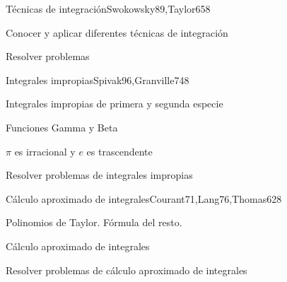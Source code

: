\begin{syllabus}
\begin{unit}{Técnicas de integración}{Swokowsky89,Taylor65}{8}
\begin{unitgoals}
	\item Conocer y aplicar diferentes técnicas de integración
	\item Resolver problemas
\end{unitgoals}
\end{unit}

\begin{unit}{Integrales impropias}{Spivak96,Granville74}{8}
\begin{topics}
	\item Integrales impropias de primera y segunda especie
	\item Funciones Gamma y Beta
	\item $\pi$ es irracional y $e$ es trascendente
\end{topics}

\begin{unitgoals}
	\item Resolver problemas de integrales impropias
\end{unitgoals}
\end{unit}

\begin{unit}{Cálculo aproximado de integrales}{Courant71,Lang76,Thomas62}{8}
\begin{topics}
      \item Polinomios de Taylor. Fórmula del resto.
      \item Cálculo aproximado de integrales
  \end{topics}

   \begin{unitgoals}
      \item Resolver problemas de cálculo aproximado de integrales
   \end{unitgoals}
\end{unit}

\begin{coursebibliography}
\end{coursebibliography}
\end{syllabus}
